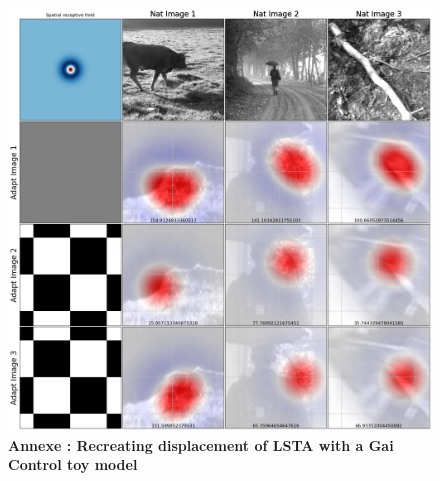 \begin{figure}[ht]
    \centering
    \includegraphics[width=\textwidth]{pics/exModel.png}
    \caption{\textbf{Annexe : Recreating displacement of LSTA with a Gai Control toy model} }
    \label{fig:ToyModel}
\end{figure}

